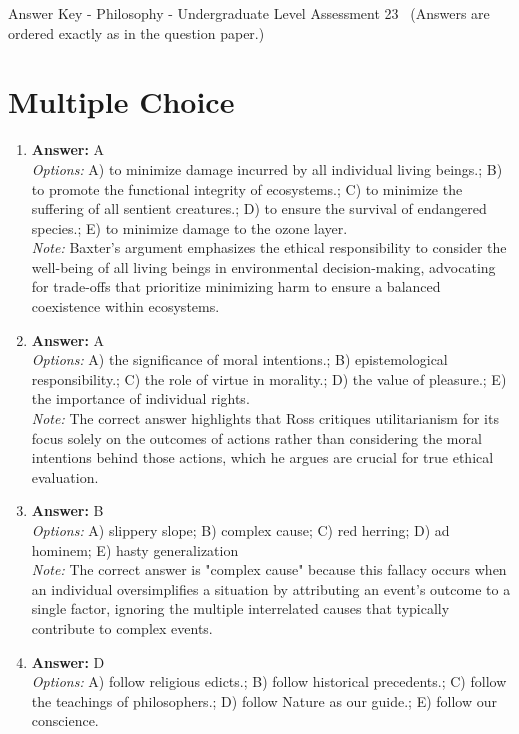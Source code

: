 \documentclass[12pt]{article}
\begin{document}
\begin{center}
Answer Key - Philosophy - Undergraduate Level Assessment 23 \
\small (Answers are ordered exactly as in the question paper.)
\end{center}

\section*{Multiple Choice}
\begin{enumerate}[label=\arabic*.]
\item \textbf{Answer:} A
\\ \textit{Options:} A) to minimize damage incurred by all individual living beings.; B) to promote the functional integrity of ecosystems.; C) to minimize the suffering of all sentient creatures.; D) to ensure the survival of endangered species.; E) to minimize damage to the ozone layer.
\\ \textit{Note:} Baxter's argument emphasizes the ethical responsibility to consider the well-being of all living beings in environmental decision-making, advocating for trade-offs that prioritize minimizing harm to ensure a balanced coexistence within ecosystems.
\item \textbf{Answer:} A
\\ \textit{Options:} A) the significance of moral intentions.; B) epistemological responsibility.; C) the role of virtue in morality.; D) the value of pleasure.; E) the importance of individual rights.
\\ \textit{Note:} The correct answer highlights that Ross critiques utilitarianism for its focus solely on the outcomes of actions rather than considering the moral intentions behind those actions, which he argues are crucial for true ethical evaluation.
\item \textbf{Answer:} B
\\ \textit{Options:} A) slippery slope; B) complex cause; C) red herring; D) ad hominem; E) hasty generalization
\\ \textit{Note:} The correct answer is "complex cause" because this fallacy occurs when an individual oversimplifies a situation by attributing an event's outcome to a single factor, ignoring the multiple interrelated causes that typically contribute to complex events.
\item \textbf{Answer:} D
\\ \textit{Options:} A) follow religious edicts.; B) follow historical precedents.; C) follow the teachings of philosophers.; D) follow Nature as our guide.; E) follow our conscience.

\end{enumerate}
\end{document}

